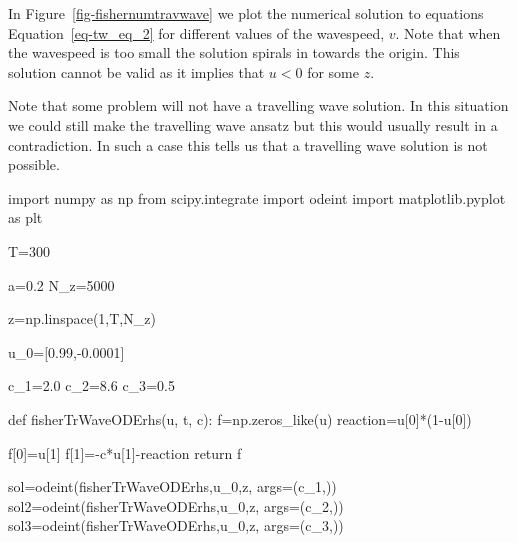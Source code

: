 \documentclass[
  letterpaper,
  DIV=11,
  numbers=noendperiod]{scrreprt}
\newenvironment{Shaded}{\begin{snugshade}}{\end{snugshade}}
\newcommand{\ControlFlowTok}[1]{\textcolor[rgb]{0.00,0.23,0.31}{#1}}
\newcommand{\DecValTok}[1]{\textcolor[rgb]{0.68,0.00,0.00}{#1}}
\newcommand{\FloatTok}[1]{\textcolor[rgb]{0.68,0.00,0.00}{#1}}
\newcommand{\ImportTok}[1]{\textcolor[rgb]{0.00,0.46,0.62}{#1}}
\newcommand{\KeywordTok}[1]{\textcolor[rgb]{0.00,0.23,0.31}{#1}}
\newcommand{\NormalTok}[1]{\textcolor[rgb]{0.00,0.23,0.31}{#1}}
\newcommand{\OperatorTok}[1]{\textcolor[rgb]{0.37,0.37,0.37}{#1}}
\theoremstyle{plain}
\theoremstyle{definition}
\theoremstyle{plain}
\theoremstyle{remark}
\begin{document}
In Figure~\ref{fig-fishernumtravwave} we plot the numerical solution to
equations Equation~\ref{eq-tw_eq_2} for different values of the
wavespeed, \(v\). Note that when the wavespeed is too small the solution
spirals in towards the origin. This solution cannot be valid as it
implies that \(u<0\) for some \(z\).

Note that some problem will not have a travelling wave solution. In this
situation we could still make the travelling wave ansatz but this would
usually result in a contradiction. In such a case this tells us that a
travelling wave solution is not possible.

\begin{Shaded}
\begin{Highlighting}[]
\ImportTok{import}\NormalTok{ numpy }\ImportTok{as}\NormalTok{ np}
\ImportTok{from}\NormalTok{ scipy.integrate }\ImportTok{import}\NormalTok{ odeint}
\ImportTok{import}\NormalTok{ matplotlib.pyplot }\ImportTok{as}\NormalTok{ plt}

\NormalTok{T}\OperatorTok{=}\DecValTok{300}

\NormalTok{a}\OperatorTok{=}\FloatTok{0.2}
\NormalTok{N\_z}\OperatorTok{=}\DecValTok{5000}

\NormalTok{z}\OperatorTok{=}\NormalTok{np.linspace(}\DecValTok{1}\NormalTok{,T,N\_z)}

\NormalTok{u\_0}\OperatorTok{=}\NormalTok{[}\FloatTok{0.99}\NormalTok{,}\OperatorTok{{-}}\FloatTok{0.0001}\NormalTok{]}

\NormalTok{c\_1}\OperatorTok{=}\FloatTok{2.0}
\NormalTok{c\_2}\OperatorTok{=}\FloatTok{8.6}
\NormalTok{c\_3}\OperatorTok{=}\FloatTok{0.5}

\KeywordTok{def}\NormalTok{ fisherTrWaveODErhs(u, t, c):}
\NormalTok{    f}\OperatorTok{=}\NormalTok{np.zeros\_like(u)}
\NormalTok{    reaction}\OperatorTok{=}\NormalTok{u[}\DecValTok{0}\NormalTok{]}\OperatorTok{*}\NormalTok{(}\DecValTok{1}\OperatorTok{{-}}\NormalTok{u[}\DecValTok{0}\NormalTok{]) }

\NormalTok{    f[}\DecValTok{0}\NormalTok{]}\OperatorTok{=}\NormalTok{u[}\DecValTok{1}\NormalTok{]}
\NormalTok{    f[}\DecValTok{1}\NormalTok{]}\OperatorTok{={-}}\NormalTok{c}\OperatorTok{*}\NormalTok{u[}\DecValTok{1}\NormalTok{]}\OperatorTok{{-}}\NormalTok{reaction}
    \ControlFlowTok{return}\NormalTok{ f  }

\NormalTok{sol}\OperatorTok{=}\NormalTok{odeint(fisherTrWaveODErhs,u\_0,z, args}\OperatorTok{=}\NormalTok{(c\_1,))}
\NormalTok{sol2}\OperatorTok{=}\NormalTok{odeint(fisherTrWaveODErhs,u\_0,z, args}\OperatorTok{=}\NormalTok{(c\_2,))}
\NormalTok{sol3}\OperatorTok{=}\NormalTok{odeint(fisherTrWaveODErhs,u\_0,z, args}\OperatorTok{=}\NormalTok{(c\_3,))}


\end{Highlighting}
\end{Shaded}
\end{document}
